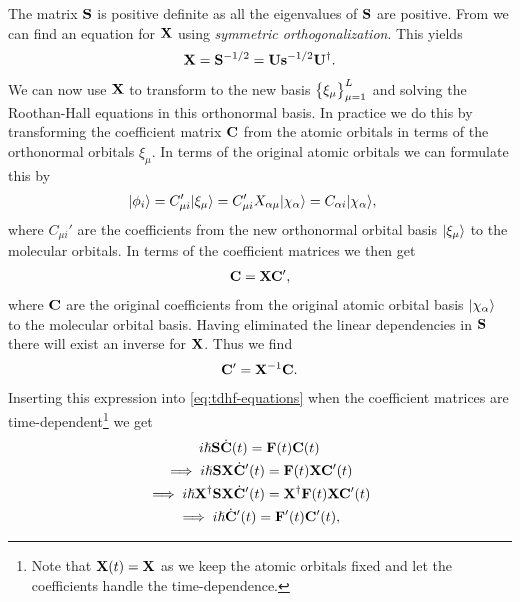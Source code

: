         The matrix $\mathbf{S}$ is positive definite as all the eigenvalues of
        $\mathbf{S}$ are positive. From \citeauthor{mayer2002lowdin} we can find an
        equation for $\mathbf{X}$ using \emph{symmetric orthogonalization}. This
        yields
        \begin{align}
            \mathbf{X} = \mathbf{S}^{-1/2} = \mathbf{U}\mathbf{s}^{-1/2}\mathbf{U}^{\dagger}.
        \end{align}
        We can now use $\mathbf{X}$ to transform to the new basis
        $\left\{ \xi_{\mu} \right\}_{\mu = 1}^{L}$ and solving the Roothan-Hall equations
        in this orthonormal basis. In practice we do this by transforming the
        coefficient matrix $\mathbf{C}$ from the atomic orbitals in terms of the
        orthonormal orbitals $\xi_{\mu}$. In terms of the original atomic
        orbitals we can formulate this by
        \begin{align}
            | \phi_i \rangle
            &= C_{\mu i}'| \xi_{\mu} \rangle
            = C_{\mu i}'X_{\alpha \mu}| \chi_{\alpha} \rangle
            = C_{\alpha i}| \chi_{\alpha} \rangle,
        \end{align}
        where $C_{\mu i}'$ are the coefficients from the new orthonormal orbital
        basis $| \xi_{\mu} \rangle$ to the molecular orbitals. In terms of the
        coefficient matrices we then get
        \begin{align}
            \mathbf{C} = \mathbf{X}\mathbf{C}',
        \end{align}
        where $\mathbf{C}$ are the original coefficients from the original atomic
        orbital basis $| \chi_{\alpha} \rangle$ to the molecular orbital basis.
        Having eliminated the linear dependencies in $\mathbf{S}$ there will exist
        an inverse for $\mathbf{X}$. Thus we find
        \begin{align}
            \mathbf{C}' = \mathbf{X}^{-1}\mathbf{C}.
        \end{align}
        Inserting this expression into \autoref{eq:tdhf-equations} when the
        coefficient matrices are time-dependent\footnote{Note that $\mathbf{X}(t) =
        \mathbf{X}$ as we keep the atomic orbitals fixed and let the coefficients
        handle the time-dependence.} we get
        \begin{gather}
            i\hslash\mathbf{S}\dot{\mathbf{C}}(t) = \mathbf{F}(t)\mathbf{C}(t) \\
            \implies
            i\hslash\mathbf{S}\mathbf{X}\dot{\mathbf{C}}'(t) = \mathbf{F}(t)\mathbf{X}\mathbf{C}'(t)
            \\
            \implies
            i\hslash\mathbf{X}^{\dagger}\mathbf{S}\mathbf{X}\dot{\mathbf{C}}'(t)
            = \mathbf{X}^{\dagger}\mathbf{F}(t)\mathbf{X}\mathbf{C}'(t)
            \\
            \implies
            i\hslash \dot{\mathbf{C}}'(t) = \mathbf{F}'(t)\mathbf{C}'(t),
        \end{gather}
